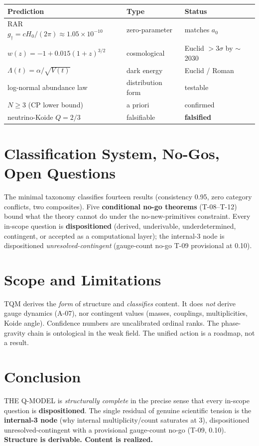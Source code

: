 \documentclass[11pt,a4paper]{article}
\begin{document}
\begin{center}
\begin{tabular}{lll}
\toprule
Prediction & Type & Status \\
\midrule
RAR $g_\dagger=cH_0/(2\pi)\approx1.05\times10^{-10}$ & zero-parameter & matches $a_0$ \\
$w(z)=-1+0.015(1+z)^{3/2}$ & cosmological & Euclid $>3\sigma$ by $\sim$2030 \\
$\Lambda(t)=\alpha/\sqrt{V(t)}$ & dark energy & Euclid / Roman \\
log-normal abundance law & distribution form & testable \\
$N\ge3$ (CP lower bound) & a priori & confirmed \\
neutrino-Koide $Q=2/3$ & falsifiable & \textbf{falsified} \\
\bottomrule
\end{tabular}
\end{center}

\section{Classification System, No-Gos, Open Questions}
\label{sec:closure}

The minimal taxonomy classifies fourteen results (consistency 0.95, zero category
conflicts, two composites). Five \textbf{conditional no-go theorems} (T-08--T-12) bound
what the theory cannot do under the no-new-primitives constraint. Every in-scope question
is \textbf{dispositioned} (derived, underivable, underdetermined, contingent, or accepted
as a computational layer); the internal-3 node is dispositioned
\emph{unresolved-contingent} (gauge-count no-go T-09 provisional at 0.10).

\section{Scope and Limitations}
\label{sec:scope}

TQM derives the \emph{form} of structure and \emph{classifies} content. It does \emph{not}
derive gauge dynamics (A-07), nor contingent values (masses, couplings, multiplicities,
Koide angle). Confidence numbers are uncalibrated ordinal ranks. The phase-gravity chain is
ontological in the weak field. The unified action is a roadmap, not a result.

\section{Conclusion}
\label{sec:conclusion}

THE Q-MODEL is \emph{structurally complete} in the precise sense that every in-scope
question is \textbf{dispositioned}. The single residual of genuine scientific tension is
the \textbf{internal-3 node} (why internal multiplicity/count saturates at 3),
dispositioned unresolved-contingent with a provisional gauge-count no-go (T-09, 0.10).
\textbf{Structure is derivable. Content is realized.}
\end{document}
